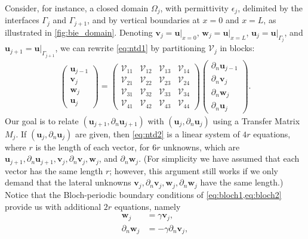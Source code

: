\documentclass[reprint,amsmath,amssymb,
 aps]{revtex4-2}
\newcommand{\bol}{\boldsymbol}
\newcommand{\Vcal}{\mathcal{V}}
\begin{document}
Consider, for instance, a closed domain $\Omega_j$, with permittivity $\epsilon_j$, delimited by the interfaces $\Gamma_j$ and $\Gamma_{j+1}$, and by vertical boundaries at $x=0$ and $x=L$, as illustrated in \cref{fig:bie_domain}. Denoting $\bol v_j = \bol u\rvert_{x=0}$, $\bol w_j = \bol u\rvert_{x=L}$, $\bol u_j = \bol u\rvert_{\Gamma_j}$, and $\bol u_{j+1} = \bol u\rvert_{\Gamma_{j+1}}$, we can rewrite \cref{eq:ntd1} by partitioning $\Vcal_j$ in blocks:
\begin{align}
\begin{pmatrix}
    \bol u_{j-1}\\
    \bol v_j\\
    \bol w_j\\
    \bol u_{j}
\end{pmatrix}
= 
\begin{pmatrix}
    \Vcal_{11} & \Vcal_{12} & \Vcal_{13} & \Vcal_{14}\\
    \Vcal_{21} & \Vcal_{22} & \Vcal_{23} & \Vcal_{24}\\
    \Vcal_{31} & \Vcal_{32} & \Vcal_{33} & \Vcal_{34}\\
    \Vcal_{41} & \Vcal_{42} & \Vcal_{43} & \Vcal_{44}
\end{pmatrix}
\begin{pmatrix}
    \partial_n \bol u_{j-1}\\
    \partial_n \bol v_j\\
    \partial_n \bol w_j\\
    \partial_n \bol u_{j}
\end{pmatrix}.
\label{eq:ntd2}
\end{align}
Our goal is to relate $(\bol u_{j+1}, \partial_n \bol u_{j+1})$ with $(\bol u_{j}, \partial_n \bol u_{j})$ using a Transfer Matrix $M_j$. If $(\bol u_{j}, \partial_n \bol u_{j})$ are given, then \cref{eq:ntd2} is a linear system of $4r$ equations, where $r$ is the length of each vector, for $6r$ unknowns, which are $\bol u_{j+1}, \partial_n\bol u_{j+1},\bol v_j, \partial_n\bol v_j,\bol w_j$, and  $\partial_n\bol w_j$. (For simplicity we have assumed that each vector has the same length $r$; however, this argument still works if we only demand that the lateral unknowns $\bol v_j, \partial_n\bol v_j,\bol w_j, \partial_n\bol w_j$ have the same length.)
Notice that the Bloch-periodic boundary conditions of \cref{eq:bloch1,eq:bloch2} provide us with additional $2r$ equations, namely
\begin{align}
    \bol w_j &= \gamma \bol v_j, \label{eq:bloch_ntd1}\\
    \partial_n \bol w_j &= -\gamma \partial_n \bol v_j, \label{eq:bloch_ntd2}
\end{align}
\end{document}
